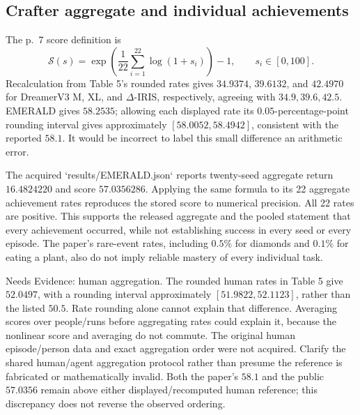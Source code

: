 \documentclass[10pt]{article}
\begin{document}
\subsection*{Crafter aggregate and individual achievements}
The p. 7 score definition is \[\mathcal{S}(s)=\exp\left(\frac1{22}\sum_{i=1}^{22}\log(1+s_i)\right)-1,
 \qquad s_i\in[0,100].\] Recalculation from Table 5’s rounded rates gives \(34.9374\), \(39.6132\), and \(42.4970\) for DreamerV3 M, XL, and \(\Delta\)-IRIS, respectively, agreeing with \(34.9,39.6,42.5\). EMERALD gives \(58.2535\); allowing each displayed rate its \(0.05\)-percentage-point rounding interval gives approximately \([58.0052,58.4942]\), consistent with the reported \(58.1\). It would be incorrect to label this small difference an arithmetic error.\par
The acquired `results/EMERALD.json` reports twenty-seed aggregate return \(16.4824220\) and score \(57.0356286\). Applying the same formula to its 22 aggregate achievement rates reproduces the stored score to numerical precision. All 22 rates are positive. This supports the released aggregate and the pooled statement that every achievement occurred, while not establishing success in every seed or every episode. The paper’s rare-event rates, including \(0.5\%\) for diamonds and \(0.1\%\) for eating a plant, also do not imply reliable mastery of every individual task.\par
Needs Evidence: human aggregation. The rounded human rates in Table 5 give \(52.0497\), with a rounding interval approximately \([51.9822,52.1123]\), rather than the listed \(50.5\). Rate rounding alone cannot explain that difference. Averaging scores over people/runs before aggregating rates could explain it, because the nonlinear score and averaging do not commute. The original human episode/person data and exact aggregation order were not acquired. Clarify the shared human/agent aggregation protocol rather than presume the reference is fabricated or mathematically invalid. Both the paper’s \(58.1\) and the public \(57.0356\) remain above either displayed/recomputed human reference; this discrepancy does not reverse the observed ordering.\par
\end{document}
